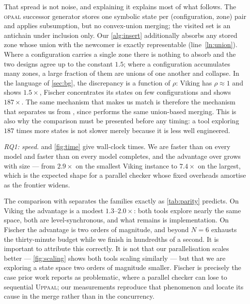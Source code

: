 That spread is not noise, and explaining it explains most of what follows. The
\textsc{opaal} successor generator stores one symbolic state per (configuration, zone) pair
and applies subsumption, but no convex-union merging; the visited set is an antichain under
inclusion only. Our \cref{alg:insert} additionally absorbs any stored zone whose union with
the newcomer is exactly representable (line~\ref{ln:union}). Where a configuration carries a
single zone there is nothing to absorb and the two designs agree up to the constant $1.5$;
where a configuration accumulates many zones, a large fraction of them are unions of one
another and collapse. In the language of \cref{sec:bg}, the discrepancy is a function of
$\rho$: Viking has $\rho \approx 1$ and shows $1.5\times$, Fischer concentrates its states on
few configurations and shows $187\times$. The same mechanism that makes us match
 is therefore the mechanism that separates us from \ltsmin{}, since
 performs the same union-based merging. This is also why the comparison must be
presented before any timing: a tool exploring $187$ times more states is not slower merely
because it is less well engineered.



\emph{RQ1: speed.}
 and \cref{fig:time} give wall-clock times. We are faster than 
on every model and faster than \ltsmin{} on every model \ltsmin{} completes, and the advantage
over  grows with size --- from $2.9\times$ on the smallest Viking instance to
$7.4\times$ on the largest, which is the expected shape for a parallel checker whose fixed
overheads amortise as the frontier widens.

The comparison with \ltsmin{} separates the families exactly as \cref{tab:parity} predicts. On
Viking the advantage is a modest $1.3$--$2.0\times$: both tools explore nearly the same space,
both are level-synchronous, and what remains is implementation. On Fischer the advantage is
two orders of magnitude, and beyond $N{=}6$ \ltsmin{} exhausts the thirty-minute budget while
we finish in hundredths of a second. It is important to attribute this correctly. It is not
that our parallelisation scales better --- \cref{fig:scaling} shows both tools scaling
similarly --- but that we are exploring a state space two orders of magnitude smaller. Fischer
is precisely the case prior work reports as problematic, where a parallel checker can lose to
sequential \textsc{Uppaal}; our measurements reproduce that phenomenon and locate its cause in
the merge rather than in the concurrency.

